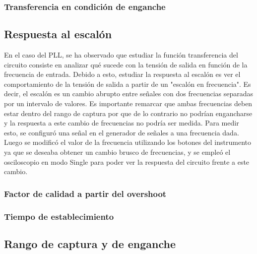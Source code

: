 	\subsubsection{Transferencia en condici\'on de enganche}

\subsection{Respuesta al escal\'on}
	En el caso del PLL, se ha observado que estudiar la funci\'on transferencia del circuito consiste en analizar qu\'e sucede con la tensi\'on de salida en funci\'on de la frecuencia de entrada. Debido a esto, estudiar la respuesta al escal\'on es ver el comportamiento de la tensi\'on de salida a partir de un "escal\'on en frecuencia". Es decir, el escal\'on es un cambio abrupto entre señales con dos frecuencias separadas por un intervalo de valores. Es importante remarcar que ambas frecuencias deben estar dentro del rango de captura por que de lo contrario no podr\'ian engancharse y la respuesta a este cambio de frecuencias no podr\'ia ser medida. Para medir esto, se configur\'o una señal en el generador de señales a una frecuencia dada. Luego se modific\'o el valor de la frecuencia utilizando los botones del instrumento ya que se deseaba obtener un cambio brusco de frecuencias, y se emple\'o el osciloscopio en modo Single para poder ver la respuesta del circuito frente a este cambio.

	\subsubsection{Factor de calidad a partir del overshoot}

	\subsubsection{Tiempo de establecimiento}

\subsection{Rango de captura y de enganche}

